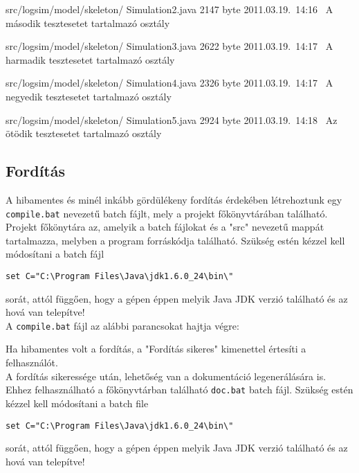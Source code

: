\begin{fajllista}
\fajl
{src/logsim/model/skeleton/\newline
Simulation2.java} %
{2147 byte} %
{2011.03.19.~14:16~} %
{A második tesztesetet tartalmazó osztály} %

\fajl
{src/logsim/model/skeleton/\newline
Simulation3.java} %
{2622 byte} %
{2011.03.19.~14:17~} %
{A harmadik tesztesetet tartalmazó osztály} %

\fajl
{src/logsim/model/skeleton/\newline
Simulation4.java} %
{2326 byte} %
{2011.03.19.~14:17~} %
{A negyedik tesztesetet tartalmazó osztály} %

\fajl
{src/logsim/model/skeleton/\newline
Simulation5.java} %
{2924 byte} %
{2011.03.19.~14:18~} %
{Az ötödik tesztesetet tartalmazó osztály} %

\end{fajllista}

\subsection{Fordítás}
A hibamentes és minél inkább gördülékeny fordítás érdekében létrehoztunk egy \texttt{compile.bat} nevezetű batch fájlt, mely a projekt főkönyvtárában található. Projekt főkönytára az, amelyik a batch fájlokat és a "src" nevezetű mappát tartalmazza, melyben a program forráskódja található. Szükség estén kézzel kell módosítani a batch fájl
\begin{verbatim}
set C="C:\Program Files\Java\jdk1.6.0_24\bin\" 
\end{verbatim}
sorát, attól függően, hogy a gépen éppen melyik Java JDK verzió található és az hová van telepítve!\\

A \texttt{compile.bat} fájl az alábbi parancsokat hajtja végre:

Ha hibamentes volt a fordítás, a "Fordítás sikeres" kimenettel értesíti a felhasználót.\\

A fordítás sikeressége után, lehetőség van a dokumentáció legenerálására is. Ehhez felhasználható a főkönyvtárban található \texttt{doc.bat} batch fájl.
Szükség estén kézzel kell módosítani a batch file \begin{verbatim}
set C="C:\Program Files\Java\jdk1.6.0_24\bin\" 
\end{verbatim}
sorát, attól függően, hogy a gépen éppen melyik Java JDK verzió található és az hová van telepítve!\\

